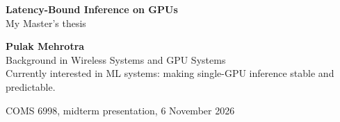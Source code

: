 \documentclass[11pt,aspectratio=169]{beamer}
\begin{document}
\begin{frame}[plain]
\vspace{1.2cm}
{\large\bfseries Latency-Bound Inference on GPUs}\\[0.3em]
{\small My Master's thesis}

\vspace{1.2cm}
{\bfseries Pulak Mehrotra}\\[0.6em]
\small
Background in Wireless Systems and GPU Systems
\\[0.6em]
Currently interested in ML systems: making single-GPU inference stable and predictable. %

\vfill
{\scriptsize\color{gray2} COMS 6998, midterm presentation, 6 November 2026}
\end{frame}
\end{document}
